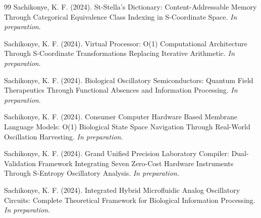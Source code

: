\documentclass[11pt,a4paper]{article}
\begin{document}
\begin{thebibliography}{99}
Sachikonye, K. F. (2024). St-Stella's Dictionary: Content-Addressable Memory Through Categorical Equivalence Class Indexing in S-Coordinate Space. \textit{In preparation}.

Sachikonye, K. F. (2024). Virtual Processor: O(1) Computational Architecture Through S-Coordinate Transformations Replacing Iterative Arithmetic. \textit{In preparation}.

Sachikonye, K. F. (2024). Biological Oscillatory Semiconductors: Quantum Field Therapeutics Through Functional Absences and Information Processing. \textit{In preparation}.

Sachikonye, K. F. (2024). Consumer Computer Hardware Based Membrane Language Models: O(1) Biological State Space Navigation Through Real-World Oscillation Harvesting. \textit{In preparation}.

Sachikonye, K. F. (2024). Grand Unified Precision Laboratory Compiler: Dual-Validation Framework Integrating Seven Zero-Cost Hardware Instruments Through S-Entropy Oscillatory Analysis. \textit{In preparation}.

Sachikonye, K. F. (2024). Integrated Hybrid Microfluidic Analog Oscillatory Circuits: Complete Theoretical Framework for Biological Information Processing. \textit{In preparation}.

\end{thebibliography}
\end{document}
